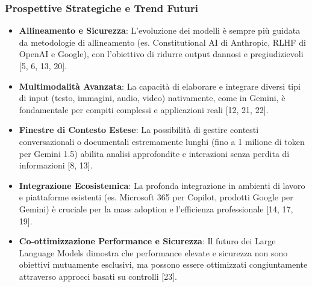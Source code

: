 \documentclass[aspectratio=169]{beamer}
\begin{document}
%
%
\begin{frame}
    \frametitle{Prospettive Strategiche e Trend Futuri}
    \begin{itemize}
    \small
        \item \textbf{Allineamento e Sicurezza}: L'evoluzione dei modelli è sempre più guidata da metodologie di allineamento (es. Constitutional AI di Anthropic, RLHF di OpenAI e Google), con l'obiettivo di ridurre output dannosi e pregiudizievoli [5, 6, 13, 20].
        \item \textbf{Multimodalità Avanzata}: La capacità di elaborare e integrare diversi tipi di input (testo, immagini, audio, video) nativamente, come in Gemini, è fondamentale per compiti complessi e applicazioni reali [12, 21, 22].
        \item \textbf{Finestre di Contesto Estese}: La possibilità di gestire contesti conversazionali o documentali estremamente lunghi (fino a 1 milione di token per Gemini 1.5) abilita analisi approfondite e interazioni senza perdita di informazioni [8, 13].
        \item \textbf{Integrazione Ecosistemica}: La profonda integrazione in ambienti di lavoro e piattaforme esistenti (es. Microsoft 365 per Copilot, prodotti Google per Gemini) è cruciale per la mass adoption e l'efficienza professionale [14, 17, 19].
        \item \textbf{Co-ottimizzazione Performance e Sicurezza}: Il futuro dei Large Language Models dimostra che performance elevate e sicurezza non sono obiettivi mutuamente esclusivi, ma possono essere ottimizzati congiuntamente attraverso approcci basati su controlli [23].
    \end{itemize}
\end{frame}
%
%
\end{document}
